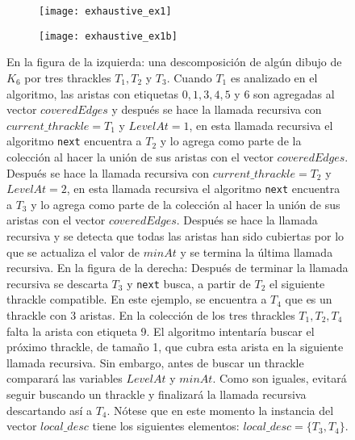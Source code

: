   \begin{figure}
    \centering
    \begin{subfigure}{.5\textwidth}
      \centering
      \texttt{[image: exhaustive\_ex1]}

    \end{subfigure}\hfill%
    \begin{subfigure}{.5\textwidth}
      \centering
      \texttt{[image: exhaustive\_ex1b]}

    \end{subfigure}\hfill%
    \caption{En la figura de la izquierda: una descomposición de algún dibujo de $K_6$ por tres thrackles
    $T_1,T_2$ y $T_3$. Cuando $T_1$ es analizado en el algoritmo, las aristas con etiquetas $0,1,3,4,5$ y
    $6$ son agregadas al vector $coveredEdges$ y después se hace la llamada recursiva con
    $current\_thrackle=T_1$ y $LevelAt=1$, en esta llamada recursiva el algoritmo \texttt{next}
    encuentra a $T_2$ y lo agrega como parte de la colección al hacer la unión de sus aristas con el vector
    $coveredEdges$. Después se  hace la llamada recursiva con $current\_thrackle=T_2$ y $LevelAt=2$, en
    esta llamada recursiva el algoritmo \texttt{next} encuentra a $T_3$ y lo agrega como parte de la
    colección al hacer la unión  de sus aristas con el vector $coveredEdges$. Después se hace la llamada
    recursiva y se detecta que todas las aristas han sido cubiertas por lo que se actualiza el valor de
    $minAt$ y se termina la última llamada recursiva. En la figura de la derecha: Después de terminar la
    llamada recursiva se descarta $T_3$ y \texttt{next} busca, a partir de $T_2$ el siguiente thrackle
    compatible. En este ejemplo, se encuentra a $T_4$ que es un thrackle con 3 aristas. En la colección de
    los tres thrackles $T_1,T_2,T_4$ falta la arista con etiqueta 9. El algoritmo intentaría buscar el
    próximo thrackle, de tamaño 1, que cubra esta arista en la siguiente llamada recursiva. Sin embargo,
    antes de buscar un thrackle comparará las variables $LevelAt$ y $minAt$. Como son iguales, evitará
    seguir buscando un thrackle y finalizará la llamada recursiva descartando así a $T_4$. Nótese que en este momento la instancia del vector $local\_desc$ tiene los siguientes elementos: $local\_desc=\{T_3,T_4\}$. }
    \label{fig:exhaustive1}
  \end{figure}


